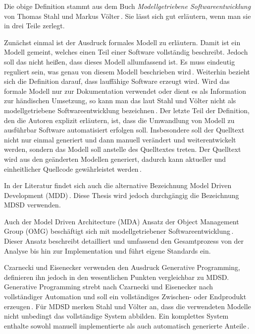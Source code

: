 \documentclass[12pt,oneside,a4paper,parskip]{scrbook}
\begin{document}
Die obige Definition stammt aus dem Buch \textit{Modellgetriebene Softwareentwicklung} von Thomas Stahl und Markus Völter\,\cite[S. 11]{stahl2007}. Sie lässt sich gut erläutern, wenn man sie in drei Teile zerlegt.

Zunächst einmal ist der Ausdruck formales Modell zu erläutern. Damit ist ein Modell gemeint, welches einen Teil einer Software vollständig beschreibt. Jedoch soll das nicht heißen, dass dieses Modell allumfassend ist. Es muss eindeutig reguliert sein, was genau von diesem Modell beschrieben wird\,\cite[S. 11f.]{stahl2007}. Weiterhin bezieht sich die Definition darauf, dass lauffähige Software erzeugt wird. Wird das formale Modell nur zur Dokumentation verwendet oder dient es als Information zur händischen Umsetzung, so kann man das laut Stahl und Völter nicht als modellgetriebene Softwareentwicklung bezeichnen\,\cite[S. 12]{stahl2007}. Der letzte Teil der Definition, den die Autoren explizit erläutern, ist, dass die Umwandlung von Modell zu ausführbar Software automatisiert erfolgen soll. Insbesondere soll der Quelltext nicht nur einmal generiert und dann manuell verändert und weiterentwickelt werden, sondern das Modell soll anstelle des Quelltextes treten. Der Quelltext wird aus den geänderten Modellen generiert, dadurch kann aktueller und einheitlicher Quellcode gewährleistet werden\,\cite[S. 13]{stahl2007}.

In der Literatur findet sich auch die alternative Bezeichnung Model Driven Development (MDD)\,\cite{selic2003,atkinson2003}. Diese Thesis wird jedoch durchgängig die Bezeichnung MDSD verwenden.

Auch der Model Driven Architecture (MDA) Ansatz der Object Management Group (OMG) beschäftigt sich mit modellgetriebener Softwareentwicklung\,\cite{mdaguide}. Dieser Ansatz beschreibt detailliert und umfassend den Gesamtprozess von der Analyse bis hin zur Implementation und führt eigene Standards ein.

Czarnecki und Eisenecker verwenden den Ausdruck Generative Programming, definieren ihn jedoch in den wesentlichen Punkten vergleichbar zu MDSD. Generative Programming strebt nach Czarnecki und Eisenecker nach vollständiger Automation und soll ein vollständiges Zwischen- oder Endprodukt erzeugen\,\cite[S. 5]{czaeis2000}. Für MDSD merken Stahl und Völter an, dass die verwendeten Modelle nicht unbedingt das vollständige System abbilden. Ein komplettes System enthalte sowohl manuell implementierte als auch automatisch generierte Anteile\,\cite[S. 13]{stahl2007}.
\end{document}
